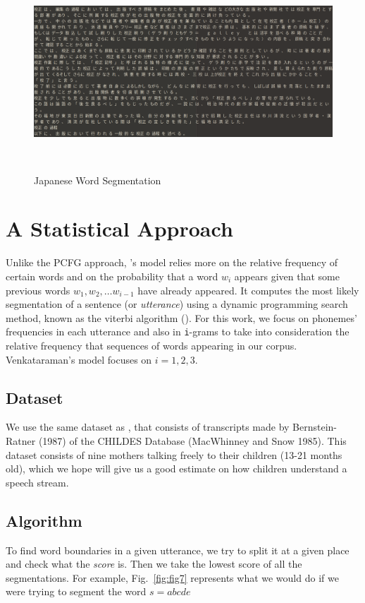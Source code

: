 \documentclass{article}
\begin{document}
\begin{figure}[h!]
  \centering
  \includegraphics[width=\columnwidth]{figures/Japanese_data.png}
  \caption{Japanese Word Segmentation}~\label{fig:figure6}
\end{figure}
\section{A Statistical Approach}

Unlike the PCFG approach, \citet{Venkataraman}'s model relies more on the relative frequency of certain words and on the probability that a word $w_i$ appears given that some previous words $w_1, w_2, \dots w_{i-1}$ have already appeared. It computes the most likely segmentation of a sentence (or \textit{utterance}) using a dynamic programming search method, known as the viterbi algorithm (\citet{viterbi}). For this work, we focus on phonemes' frequencies in each utterance and also in \texttt{i}-grams to take into consideration the relative frequency that sequences of words appearing in our corpus. Venkataraman's model focuses on $i= 1, 2, 3$.
\subsection{Dataset}
We use the same dataset as \citet{Brent}, that consists of transcripts made by Bernstein-Ratner (1987) of the CHILDES Database (MacWhinney and Snow 1985). This dataset consists of nine mothers talking freely to their children (13-21 months old), which we hope will give us a good estimate on how children understand a speech stream. 

\subsection{Algorithm}
To find word boundaries in a given utterance, we try to split it at a given place and check what the \textit{score} is. Then we take the lowest score of all the segmentations.  For example, Fig.~\ref{fig:fig7} represents what we would do if we were trying to segment the word $s = abcde$
\end{document}
